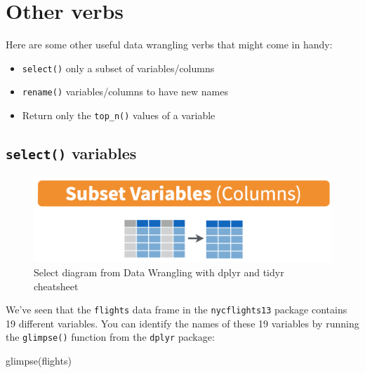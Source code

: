 \documentclass[
  letterpaper,
  DIV=11,
  numbers=noendperiod]{scrreprt}
\newenvironment{Shaded}{\begin{snugshade}}{\end{snugshade}}
\newcommand{\FunctionTok}[1]{\textcolor[rgb]{0.28,0.35,0.67}{#1}}
\newcommand{\NormalTok}[1]{\textcolor[rgb]{0.00,0.23,0.31}{#1}}
\providecommand{\tightlist}{%
  \setlength{\itemsep}{0pt}\setlength{\parskip}{0pt}}\usepackage{longtable,booktabs,array}
\theoremstyle{definition}
\theoremstyle{remark}
\begin{document}
\hypertarget{sec-other-verbs}{%
\section{Other verbs}\label{sec-other-verbs}}

Here are some other useful data wrangling verbs that might come in
handy:

\begin{itemize}
\tightlist
\item
  \texttt{select()} only a subset of variables/columns
\item
  \texttt{rename()} variables/columns to have new names
\item
  Return only the \texttt{top\_n()} values of a variable
\end{itemize}

\hypertarget{sec-select}{%
\subsection{\texorpdfstring{\texttt{select()}
variables}{select() variables}}\label{sec-select}}

\begin{figure}

{\centering \includegraphics{images/select.png}

}

\caption{Select diagram from Data Wrangling with dplyr and tidyr
cheatsheet}

\end{figure}

We've seen that the \texttt{flights} data frame in the
\texttt{nycflights13} package contains 19 different variables. You can
identify the names of these 19 variables by running the
\texttt{glimpse()} function from the \texttt{dplyr} package:

\begin{Shaded}
\begin{Highlighting}[]
\FunctionTok{glimpse}\NormalTok{(flights)}
\end{Highlighting}
\end{Shaded}
\end{document}
